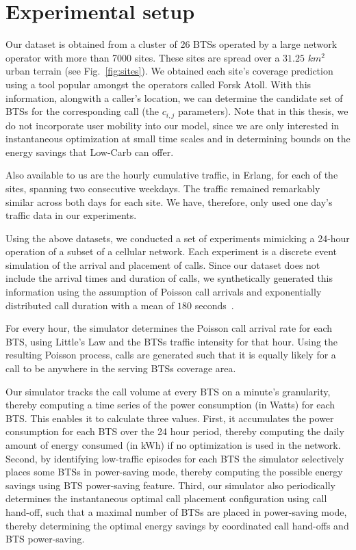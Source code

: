 \section{Experimental setup} 
\label{sec:case2:experiments} Our dataset is obtained from a cluster of 26 BTSs operated by a large network operator with more than 7000 sites. These sites are spread over a $31.25$ $km^2$ urban terrain (see Fig.~\ref{fig:sites}). We obtained each site's coverage prediction using a tool popular amongst the operators called Forsk Atoll. With this information, alongwith a caller's location, we can determine the candidate set of BTSs for the corresponding call (the $c_{i,j}$ parameters). Note that in this thesis, we do not incorporate user mobility into our model, since we are only interested in instantaneous optimization at small time scales and in determining bounds on the energy savings that Low-Carb can offer.

Also available to us are the hourly cumulative traffic, in Erlang, for each of the sites, spanning two consecutive weekdays. The traffic remained remarkably similar across both days for each site. We have, therefore, only used one day's traffic data in our experiments.

Using the above datasets, we conducted a set of experiments mimicking a 24-hour operation of a subset of a cellular network. Each experiment is a discrete event simulation of the arrival and placement of calls. Since our dataset does not include the arrival times and duration of calls, we synthetically generated this information using the assumption of Poisson call arrivals and exponentially distributed call duration with a mean of $180$ seconds~\cite{Gerla:1995:MMM:276418.276421}.

For every hour, the simulator determines the Poisson call arrival rate for each BTS, using Little's Law and the BTSs traffic intensity for that hour. Using the resulting Poisson process, calls are generated such that it is equally likely for a call to be anywhere in the serving BTSs coverage area.

Our simulator tracks the call volume at every BTS on a minute's granularity, thereby computing a time series of the power consumption (in Watts) for each BTS. This enables it to calculate three values. First, it accumulates the power consumption for each BTS over the 24 hour period, thereby computing the daily amount of energy consumed (in kWh) if no optimization is used in the network. Second, by identifying low-traffic episodes for each BTS the simulator selectively places some BTSs in power-saving mode, thereby computing the possible energy savings using BTS power-saving feature. Third, our simulator also periodically determines the instantaneous optimal call placement configuration using call hand-off, such that a maximal number of BTSs are placed in power-saving mode, thereby determining the optimal energy savings by coordinated call hand-offs and BTS power-saving.

